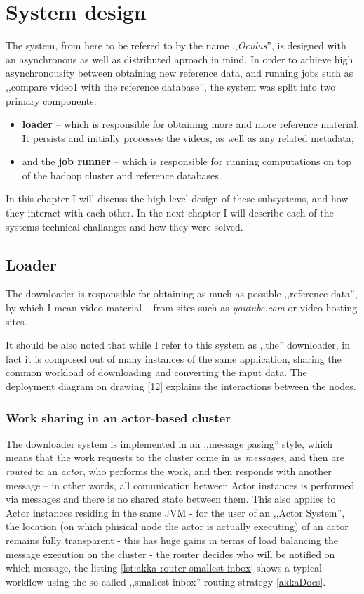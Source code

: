 \chapter{System design}

The system, from here to be refered to by the name ,,\textit{Oculus}'', is designed with an asynchronous as well as distributed aproach in mind. In order to achieve high asynchronousity between obtaining new reference data, and running jobs such as ,,compare video1 with the reference database'', the system was split into two primary components: 

\begin{itemize}
  \item \textbf{loader} -- which is responsible for obtaining more and more reference material. It persists and initially processes the videos, as well as any related metadata,
  \item and the \textbf{job runner} -- which is responsible for running computations on top of the hadoop cluster and reference databases.
\end{itemize}

In this chapter I will discuss the high-level design of these subsystems, and how they interact with each other. In the next chapter I will describe each of the systems technical challanges and how they were solved.

\section{Loader}
The downloader is responsible for obtaining as much as possible ,,reference data'', by which I mean video material -- from sites such as \textit{youtube.com} or video hosting sites.

It should be also noted that while I refer to this system as ,,the'' downloader, in fact it is composed out of many instances of the same application, sharing the common workload of downloading and converting the input data. The deployment diagram on drawing [12] explains the interactions between the nodes.

\subsection{Work sharing in an actor-based cluster}
The downloader system is implemented in an ,,message pasing'' style, which means that the work requests to the cluster come in as \textit{messages}, and then are \textit{routed} to an \textit{actor}, who performs the work, and then responds with another message -- in other words, all comunication between Actor instances is performed via messages and there is no shared state between them. 
This also applies to Actor instances residing in the same JVM - for the user of an ,,Actor System'', the location (on which phisical node the actor is actually executing) of an actor remains fully transparent - this has huge gains in terms of load balancing the message execution on the cluster - the router decides who will be notified on which message, the listing \ref{lst:akka-router-smallest-inbox} shows a typical workflow using the so-called ,,smallest inbox'' routing strategy \ref{akkaDocs}.

